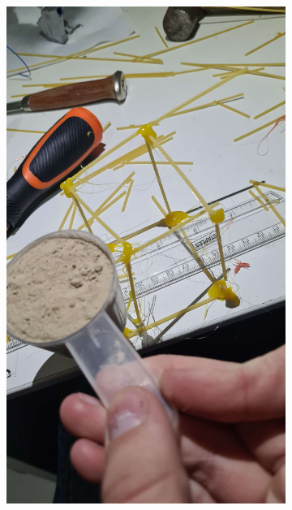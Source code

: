 \documentclass{report}
\begin{document}
\begin{figure}[h]
	\begin{subfigure}{.5\textwidth}
		\centering
		\includegraphics[width=.7\linewidth]{cube-a}


\end{subfigure}
\end{figure}
\end{document}
